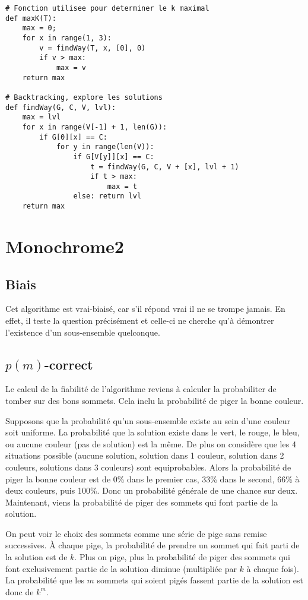 \documentclass{article}
\begin{document}
\begin{lstlisting}
# Fonction utilisee pour determiner le k maximal
def maxK(T):
	max = 0;
	for x in range(1, 3):
		v = findWay(T, x, [0], 0)
		if v > max:
			max = v
	return max

# Backtracking, explore les solutions
def findWay(G, C, V, lvl):
	max = lvl
	for x in range(V[-1] + 1, len(G)):
		if G[0][x] == C:
			for y in range(len(V)):
				if G[V[y]][x] == C:
					t = findWay(G, C, V + [x], lvl + 1)
					if t > max:
						max = t
				else: return lvl
	return max
\end{lstlisting}
\section{Monochrome2}
\subsection{Biais}
Cet algorithme est vrai-biaisé, car s'il répond vrai il ne se trompe jamais. En effet, il teste la question précisément et celle-ci ne cherche qu'à démontrer l'existence d'un sous-ensemble quelconque.
\subsection{$p(m)$-correct}
Le calcul de la fiabilité de l'algorithme reviens à calculer la probabiliter de tomber sur des bons sommets. Cela inclu la probabilité de piger la bonne couleur.

Supposons que la probabilité qu'un sous-ensemble existe au sein d'une couleur soit uniforme. La probabilité que la solution existe dans le vert, le rouge, le bleu, ou aucune couleur (pas de solution) est la même. De plus on considère que les 4 situations possible (aucune solution, solution dans 1 couleur, solution dans 2 couleurs, solutions dans 3 couleurs) sont equiprobables. Alors la probabilité de piger la bonne couleur est de 0\% dans le premier cas, 33\% dans le second, 66\% à deux couleurs, puis 100\%. Donc un probabilité générale de une chance sur deux. Maintenant, viens la probabilité de piger des sommets qui font partie de la solution.

On peut voir le choix des sommets comme une série de pige sans remise successives. À chaque pige, la probabilité de prendre un sommet qui fait parti de la solution est de $k$. Plus on pige, plus la probabilité de piger des sommets qui font exclusivement partie de la solution diminue (multipliée par $k$ à chaque fois). La probabilité que les $m$ sommets qui soient pigés fassent partie de la solution est donc de $k^m$.
\end{document}
